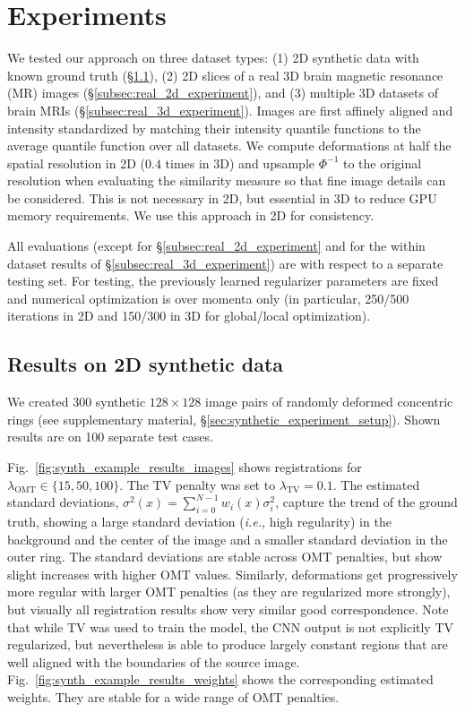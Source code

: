 \documentclass[10pt,twocolumn,letterpaper,table]{article}
\numberwithin{equation}{section}
\theoremstyle{plain}
\theoremstyle{definition}
\def\ie{\emph{i.e.}}  \def\Ie{\emph{I.e.}}
\begin{document}
\section{Experiments}
\label{sec:experiments}

We tested our approach on three dataset types: (1) 2D synthetic data with known ground truth (\S\ref{subsec:synthetic_experiment}), (2) 2D slices of a real 3D brain magnetic resonance (MR) images (\S\ref{subsec:real_2d_experiment}), and (3) multiple 3D datasets of brain MRIs (\S\ref{subsec:real_3d_experiment}). Images are first affinely aligned and intensity standardized by matching their intensity quantile functions to the average quantile function over all datasets. We compute deformations at half the spatial resolution in 2D  ($0.4$ times in 3D) and upsample $\Phi^{-1}$ to the original resolution when evaluating the similarity measure so that fine image details can be considered. This is not necessary in 2D, but essential in 3D to reduce GPU memory requirements. We use this approach in 2D for consistency. 

All evaluations (except for 
\S\ref{subsec:real_2d_experiment} and for the within dataset results of \S\ref{subsec:real_3d_experiment}) are with respect to a separate testing set. For testing, the previously learned regularizer parameters are fixed and numerical optimization is over momenta only (in particular, 250/500 iterations in 2D and 150/300 in 3D for global/local optimization).
  
\subsection{Results on 2D synthetic data}
\label{subsec:synthetic_experiment}

We created 300 synthetic  $128 \times 128$ image pairs of randomly deformed concentric rings (see supplementary material, \S\ref{sec:synthetic_experiment_setup}). Shown results are on 100 separate test cases.

Fig.~\ref{fig:synth_example_results_images} shows registrations for $\lambda_{\text{OMT}}\in\{15,50,100\}$. The TV penalty was set to $\lambda_{\text{TV}}=0.1$. 
The estimated standard deviations, $\sigma^2(x)=\sum_{i=0}^{N-1}w_i(x)\sigma_i^2$, capture the trend of the ground truth, showing a large standard deviation (\ie, high regularity) in the background and the center of the image and a smaller standard deviation in the outer ring. The standard deviations are stable across OMT penalties, but show slight increases with higher OMT values. Similarly, deformations get progressively more regular with larger OMT penalties (as they are regularized more strongly), but visually all registration results show very similar good correspondence.
Note that while TV was used to train the model, the CNN output is not explicitly TV regularized, but nevertheless is able to produce largely constant regions that are well aligned with the boundaries of the source image. Fig.~\ref{fig:synth_example_results_weights} shows the corresponding estimated weights. They are stable for a wide range of OMT penalties.
\end{document}
